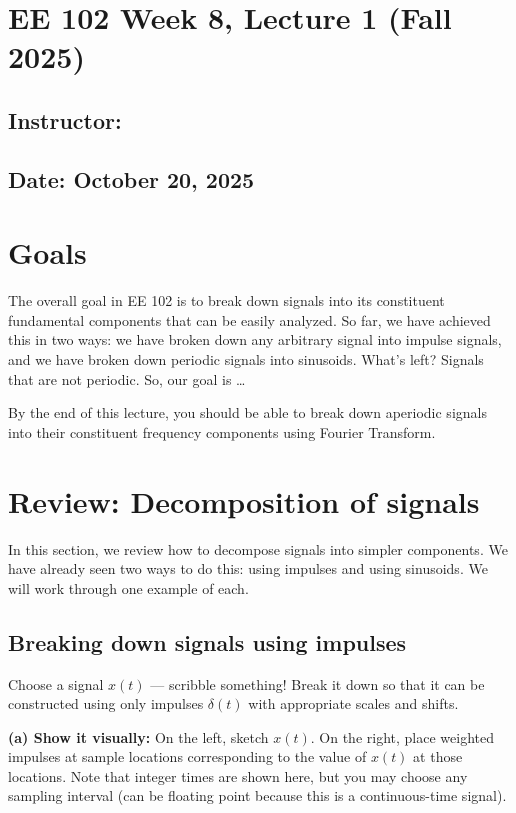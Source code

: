 \documentclass{ee102_notes}
\renewcommand{\releasedate}{October 20, 2025}
\begin{document}
\section*{EE 102 Week 8, Lecture 1 (Fall 2025)}
\subsection*{Instructor: \instructor}
\subsection*{Date: \releasedate}

\section{Goals}
The overall goal in EE 102 is to break down signals into its constituent fundamental components that can be easily analyzed. So far, we have achieved this in two ways: we have broken down any arbitrary signal into impulse signals, and we have broken down periodic signals into sinusoids. What's left? Signals that are not periodic. So, our goal is \dots 

By the end of this lecture, you should be able to break down aperiodic signals into their constituent frequency components using Fourier Transform.
\section{Review: Decomposition of signals}
In this section, we review how to decompose signals into simpler components. We have already seen two ways to do this: using impulses and using sinusoids. We will work through one example of each. 
\subsection{Breaking down signals using impulses}
Choose a signal $x(t)$ --- scribble something! Break it down so that it can be constructed using only impulses $\delta(t)$ with appropriate scales and shifts.

\medskip
\textbf{(a) Show it visually: } On the left, sketch $x(t)$. On the right, place weighted impulses at sample locations corresponding to the value of $x(t)$ at those locations. Note that integer times are shown here, but you may choose any sampling interval (can be floating point because this is a continuous-time signal).
\end{document}

